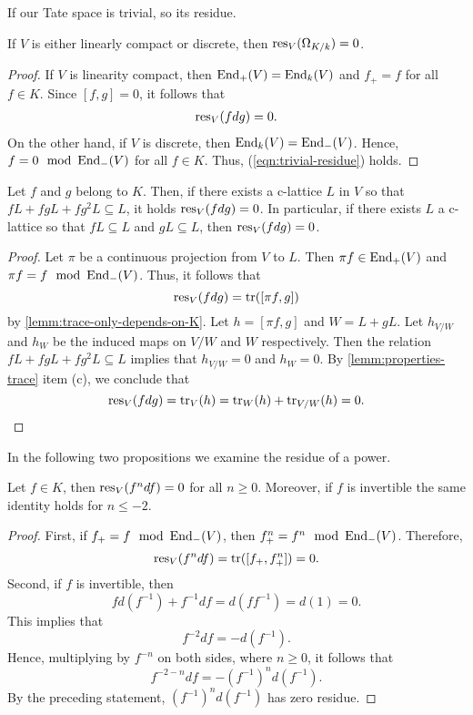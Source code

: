If our Tate space is trivial, so its residue.
\begin{proposition}\label{prop:residue-trivial-tate-space}
	If $V$ is either linearly compact or discrete, then $\operatorname{res}_{V}(\Omega_{K/k}) = 0$.
\end{proposition}
\begin{proof}
	If $V$ is linearity compact, then $\operatorname{End}_{+}(V) = \operatorname{End}_{k}(V)$ and $f_{+} = f$ for all $f \in K$. Since $[f,g] = 0$, it follows that 
	\begin{align}\label{eqn:trivial-residue}
		\operatorname{res}_{V}(fdg) = 0.
	\end{align}
	On the other hand, if $V$ is discrete, then $\operatorname{End}_{k}(V) = \operatorname{End}_{-}(V)$. Hence, $f = 0 \mod {\operatorname{End}}_{-}(V)$ for all $f \in K$. Thus, (\ref{eqn:trivial-residue}) holds.
\end{proof}
\begin{proposition}\label{prop:residue-and-continuity}
	Let $f$ and $g$ belong to $K$. Then, if there exists a c-lattice $L$ in $V$ so that $fL + fgL + fg^{2}L \subseteq L$, it holds $\operatorname{res}_{V}(fdg) = 0$. In particular, if there exists $L$ a c-lattice so that $fL \subseteq L$ and $gL \subseteq L$, then $\operatorname{res}_{V}(fdg) = 0$.
\end{proposition}
\begin{proof}
	Let $\pi$ be a continuous projection from $V$ to $L$. Then $\pi f \in \operatorname{End}_{+}(V)$ and $\pi f = f \mod {\operatorname{End}}_{-}(V)$. Thus, it follows that
	\[
		\operatorname{res}_{V}(fdg) = \operatorname{tr}([\pi f, g]) 
	\] 
	by \cref{lemm:trace-only-depends-on-K}. Let $h = [\pi f,g]$ and $W = L + gL$. Let $h_{V/W}$ and $h_{W}$ be the induced maps on $V/W$ and $W$ respectively. Then the relation $fL + fgL + fg^{2}L \subseteq L$ implies that $h_{V/W} = 0$ and $h_{W} = 0$. By \cref{lemm:properties-trace} item (c), we conclude that
	\[
		\operatorname{res}_{V}(fdg) = \operatorname{tr}_{V}(h) = \operatorname{tr}_{W}(h) + \operatorname{tr}_{V/W}(h) = 0.
	\]
\end{proof}
In the following two propositions we examine the residue of a power.
\begin{proposition}\label{prop:residue-of-a-power}
	Let $f \in K$, then $\operatorname{res}_{V}(f^{n}df) = 0$ for all $n \geq 0$. Moreover, if $f$ is invertible the same identity holds for $n \leq -2$.
\end{proposition}
\begin{proof}
	First, if $f_{+} = f \mod {\operatorname{End}}_{-}(V)$, then $f_{+}^{n} = f^{n} \mod {\operatorname{End}}_{-}(V)$. Therefore,
	\[
		\operatorname{res}_{V}(f^{n} df) = \operatorname{tr}([f_{+},f_{+}^{n}]) = 0.
	\]
	Second, if $f$ is invertible, then
	\[
		fd(f^{-1}) + f^{-1}df = d(ff^{-1}) = d(1) = 0.
	\]
	This implies that
	\[
	f^{-2}df = -d(f^{-1}).
	\]
	Hence, multiplying by $f^{-n}$ on both sides, where $n\geq 0$, it follows that
	\[
	f^{-2-n}df = -(f^{-1})^{n}d(f^{-1}).
	\]
	By the preceding statement, $(f^{-1})^{n}d(f^{-1})$ has zero residue. 
\end{proof}
